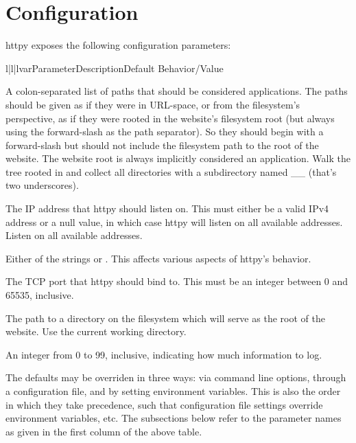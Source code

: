 \chapter{Configuration}

httpy exposes the following configuration parameters:


\begin{tableiii}{l|l|l}{var}{Parameter}{Description}{Default Behavior/Value}

    {A colon-separated list of paths that should be considered applications. The
    paths should be given as if they were in URL-space, or from the filesystem's
    perspective, as if they were rooted in the website's filesystem root (but
    always using the forward-slash as the path separator). So they should begin
    with a forward-slash but should not include the filesystem path to the root
    of the website. The website root is always implicitly considered an
    application.}
    {Walk the tree rooted in  and collect all directories with a
    subdirectory named __ (that's two underscores).}

    {The IP address that httpy should listen on. This must either be a valid
    IPv4 address or a null value, in which case httpy will listen on all
    available addresses.}
    {Listen on all available addresses.}

    {Either of the strings  or . This affects
    various aspects of httpy's behavior.}
    {}

    {The TCP port that httpy should bind to. This must be an integer between 0
    and 65535, inclusive.}
    {}

    {The path to a directory on the filesystem which will serve as the root of
    the website.}
    {Use the current working directory.}

    {An integer from 0 to 99, inclusive, indicating how much information to
    log.}
    {}

\end{tableiii}

The defaults may be overriden in three ways: via command line options, through a
configuration file, and by setting environment variables. This is also the order
in which they take precedence, such that configuration file settings override
environment variables, etc. The subsections below refer to the parameter names
as given in the first column of the above table.





